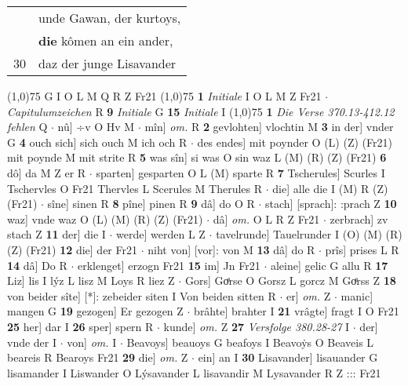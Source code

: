 \documentclass[8pt,a4paper,notitlepage]{article}
\begin{document}
\begin{table}[ht]
\begin{minipage}[t]{0.5\linewidth}
\begin{tabular}{rl}
 & unde Gawan, der kurtoys,\\ 
 & \textbf{die} kômen an ein ander,\\ 
30 & daz der junge Lisavander\\ 
\end{tabular}
\scriptsize
\line(1,0){75} \newline
G I O L M Q R Z Fr21 \newline
\line(1,0){75} \newline
\textbf{1} \textit{Initiale} I O L M Z Fr21   $\cdot$ \textit{Capitulumzeichen} R  \textbf{9} \textit{Initiale} G  \textbf{15} \textit{Initiale} I  \newline
\line(1,0){75} \newline
\textbf{1} \textit{Die Verse 370.13-412.12 fehlen} Q   $\cdot$ nû] ÷v O Hv M  $\cdot$ mîn] \textit{om.} R \textbf{2} gevlohten] vlochtin M \textbf{3} in der] vnder G \textbf{4} ouch sich] sich ouch M ich och R  $\cdot$ des endes] mit poynder O (L) (Z) (Fr21) mit poynde M mit strite R \textbf{5} was sîn] si was O sin waz L (M) (R) (Z) (Fr21) \textbf{6} dô] da M Z er R  $\cdot$ sparten] gesparten O L (M) sparte R \textbf{7} Tscherules] Scurles I Tschervles O Fr21 Thervles L Scerules M Therules R  $\cdot$ die] alle die I (M) R (Z) (Fr21)  $\cdot$ sîne] sinen R \textbf{8} pîne] pinen R \textbf{9} dâ] do O R  $\cdot$ stach] [sprach]: :prach Z \textbf{10} waz] vnde waz O (L) (M) (R) (Z) (Fr21)  $\cdot$ dâ] \textit{om.} O L R Z Fr21  $\cdot$ zerbrach] zv stach Z \textbf{11} der] die I  $\cdot$ werde] werden L Z  $\cdot$ tavelrunde] Tauelrunder I (O) (M) (R) (Z) (Fr21) \textbf{12} die] der Fr21  $\cdot$ niht von] [vor]: von M \textbf{13} dâ] do R  $\cdot$ prîs] prises L R \textbf{14} dâ] Do R  $\cdot$ erklenget] erzogn Fr21 \textbf{15} im] Jn Fr21  $\cdot$ aleine] gelic G allu R \textbf{17} Liz] lis I lýz L lisz M Loys R liez Z  $\cdot$ Gors] Goͤrse O Gorsz L gorcz M Goͤrss Z \textbf{18} von beider sîte] [*]: zebeider siten I Von beiden sitten R  $\cdot$ er] \textit{om.} Z  $\cdot$ manic] mangen G \textbf{19} gezogen] Er gezogen Z  $\cdot$ brâhte] brahter I \textbf{21} vrâgte] fragt I O Fr21 \textbf{25} her] dar I \textbf{26} sper] spern R  $\cdot$ kunde] \textit{om.} Z \textbf{27} \textit{Versfolge 380.28-27} I   $\cdot$ der] vnde der I  $\cdot$ von] \textit{om.} I  $\cdot$ Beavoys] beauoys G beafoys I Beavoẏs O Beaveis L beareis R Bearoys Fr21 \textbf{29} die] \textit{om.} Z  $\cdot$ ein] an I \textbf{30} Lisavander] lisauander G lisamander I Liswander O Lýsavander L lisavandir M Lysavander R Z ::: Fr21 \newline

\end{minipage}
\end{table}
\end{document}
